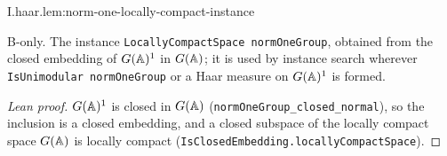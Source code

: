 \begin{lemma}
\bonly
{}
\end{lemma}
\begin{tfformal}{I.haar.lem:norm-one-locally-compact-instance}
\begin{tffidelity}
B-only. The instance \texttt{LocallyCompactSpace normOneGroup}, obtained from the closed embedding of $G(\mathbb{A})^1$ in $G(\mathbb{A})$; it is used by instance search wherever \texttt{IsUnimodular normOneGroup} or a Haar measure on $G(\mathbb{A})^1$ is formed.
\end{tffidelity}
\end{tfformal}
\begin{proof}[Lean proof]
$G(\mathbb{A})^1$ is closed in $G(\mathbb{A})$ (\texttt{normOneGroup\_closed\_normal}), so the inclusion is a closed embedding, and a closed subspace of the locally compact space $G(\mathbb{A})$ is locally compact (\texttt{IsClosedEmbedding.locallyCompactSpace}).
\end{proof}

